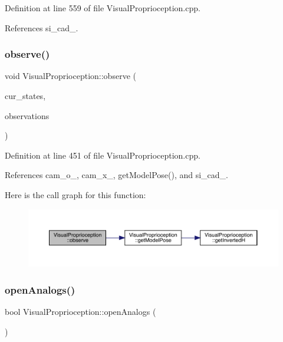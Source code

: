 Definition at line 559 of file Visual\+Proprioception.\+cpp.



References si\+\_\+cad\+\_\+.

\mbox{\label{classVisualProprioception_a9ca620e3c2dde045da52f34a600daa47}} 
\subsubsection{\texorpdfstring{observe()}{observe()}}
{\footnotesize\ttfamily void Visual\+Proprioception\+::observe (\begin{DoxyParamCaption}\item[{const Eigen\+::\+Ref$<$ const Eigen\+::\+Matrix\+Xf $>$ \&}]{cur\+\_\+states,  }\item[{cv\+::\+Output\+Array}]{observations }\end{DoxyParamCaption})\hspace{0.3cm}{\ttfamily [override]}}



Definition at line 451 of file Visual\+Proprioception.\+cpp.



References cam\+\_\+o\+\_\+, cam\+\_\+x\+\_\+, get\+Model\+Pose(), and si\+\_\+cad\+\_\+.

Here is the call graph for this function\+:
\nopagebreak
\begin{figure}[H]
\begin{center}
\leavevmode
\includegraphics[width=350pt]{classVisualProprioception_a9ca620e3c2dde045da52f34a600daa47_cgraph}
\end{center}
\end{figure}
\mbox{\label{classVisualProprioception_aade0b47250e8315166b36f7b731d360d}} 
\subsubsection{\texorpdfstring{open\+Analogs()}{openAnalogs()}}
{\footnotesize\ttfamily bool Visual\+Proprioception\+::open\+Analogs (\begin{DoxyParamCaption}{ }\end{DoxyParamCaption})\hspace{0.3cm}{\ttfamily [protected]}}



